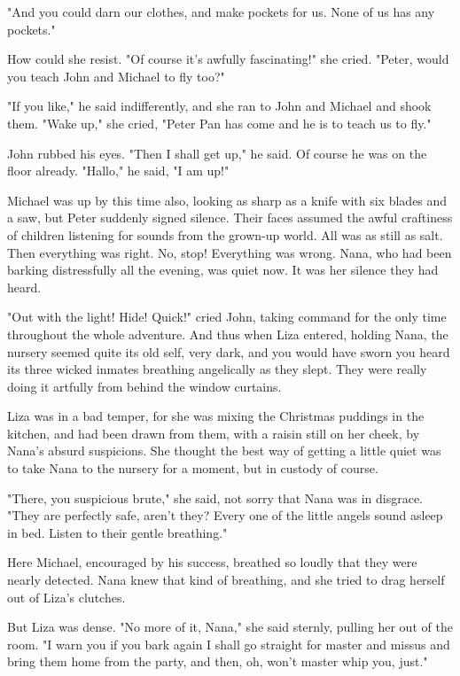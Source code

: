 "And you could darn our clothes, and make pockets for us. None of us has
any pockets."


How could she resist. "Of course it's awfully fascinating!" she cried.
"Peter, would you teach John and Michael to fly too?"


"If you like," he said indifferently, and she ran to John and Michael and
shook them. "Wake up," she cried, "Peter Pan has come and he is to teach
us to fly."


John rubbed his eyes. "Then I shall get up," he said. Of course he was on
the floor already. "Hallo," he said, "I am up!"


Michael was up by this time also, looking as sharp as a knife with six
blades and a saw, but Peter suddenly signed silence. Their faces assumed
the awful craftiness of children listening for sounds from the grown-up
world. All was as still as salt. Then everything was right. No, stop!
Everything was wrong. Nana, who had been barking distressfully all the
evening, was quiet now. It was her silence they had heard.


"Out with the light! Hide! Quick!" cried John, taking command for the only
time throughout the whole adventure. And thus when Liza entered, holding
Nana, the nursery seemed quite its old self, very dark, and you would have
sworn you heard its three wicked inmates breathing angelically as they
slept. They were really doing it artfully from behind the window curtains.


Liza was in a bad temper, for she was mixing the Christmas puddings in the
kitchen, and had been drawn from them, with a raisin still on her cheek,
by Nana's absurd suspicions. She thought the best way of getting a little
quiet was to take Nana to the nursery for a moment, but in custody of
course.


"There, you suspicious brute," she said, not sorry that Nana was in
disgrace. "They are perfectly safe, aren't they? Every one of the little
angels sound asleep in bed. Listen to their gentle breathing."


Here Michael, encouraged by his success, breathed so loudly that they were
nearly detected. Nana knew that kind of breathing, and she tried to drag
herself out of Liza's clutches.


But Liza was dense. "No more of it, Nana," she said sternly, pulling her
out of the room. "I warn you if you bark again I shall go straight for
master and missus and bring them home from the party, and then, oh, won't
master whip you, just."


